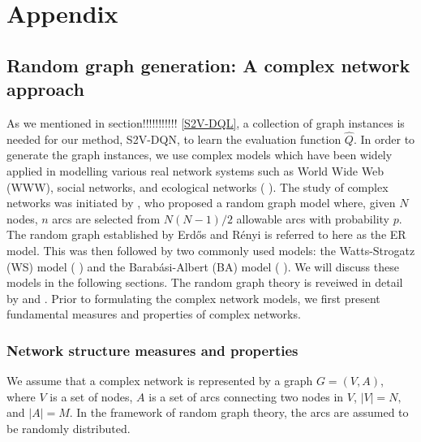 \chapter{Appendix}
\label{chap:appendix}

\section{Random graph generation: A complex network approach}
As we mentioned in section!!!!!!!!!!! \ref{S2V-DQL}, a collection of graph instances is needed for our method, S2V-DQN, to learn the evaluation function $\widehat{Q}$. In order to generate the graph instances, we use complex models which have been widely applied in modelling various real network systems such as World Wide Web (WWW), social networks, and ecological networks (\citeauthor{albert2002} \cite{albert2002}). The study of complex networks was initiated by \citeauthor{erdHos1960} \cite{erdHos1960}, who proposed a random graph model where, given $N$ nodes, $n$ arcs are selected from $N(N-1)/2$ allowable arcs with probability $p$. The random graph established by Erd{\H{o}}s and R{\'e}nyi \cite{erdHos1960} is referred to here as the ER model. This was then followed by two commonly used models: the Watts-Strogatz (WS) model (\citeauthor{watts1998} \cite{watts1998}) and the Barab\'asi-Albert (BA) model  (\citeauthor{barabasi1999emergence} \cite{barabasi1999emergence}). We will discuss these models in the following sections. The random graph theory is reveiwed in detail by \citeauthor{bollobas2001random} \cite{bollobas2001random} and \citeauthor{albert2002} \cite{albert2002}. Prior to formulating the complex network models, we first present fundamental measures and properties of complex networks.

\subsection{Network structure measures and properties}
We assume that a complex network is represented by a graph $G = (V, A)$, where $V$ is a set of nodes, $A$ is a set of arcs connecting two nodes in $V$, $|V| = N,$ and $|A| = M$. In the framework of random graph theory, the arcs are assumed to be  randomly distributed.

